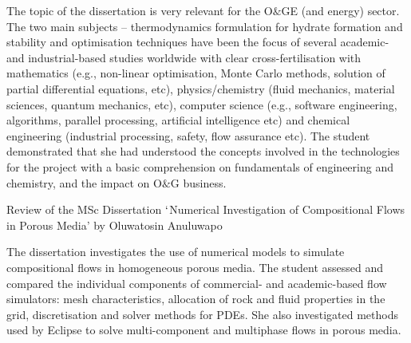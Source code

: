 \documentclass[14pt,twoside]{report}
\begin{document}
The topic of the dissertation is very relevant for the O$\&$GE (and energy) sector. The two main subjects -- thermodynamics formulation for hydrate formation and stability and optimisation techniques  have been the focus of several academic- and industrial-based studies worldwide with clear cross-fertilisation with mathematics (e.g., non-linear optimisation, Monte Carlo methods, solution of partial differential equations, etc), physics/chemistry (fluid mechanics, material sciences, quantum mechanics, etc), computer science (e.g., software engineering, algorithms, parallel processing, artificial intelligence etc) and chemical engineering (industrial processing, safety, flow assurance etc). The student demonstrated that she had understood the concepts involved in the technologies for the project with a basic comprehension on fundamentals of engineering and chemistry, and the impact on O$\&$G business.    


\clearpage



\medskip

\begin{center}
{\Large Review of the MSc Dissertation $\lq$Numerical Investigation of Compositional Flows in Porous Media' by Oluwatosin Anuluwapo}
\end{center}

\medskip

The dissertation investigates the use of numerical models to simulate compositional flows in homogeneous porous media. The student assessed and compared the individual components of commercial- and academic-based flow simulators: mesh characteristics, allocation of rock and fluid properties in the grid, discretisation and solver methods for PDEs. She also investigated methods used by Eclipse to solve multi-component and multiphase flows in porous media.
\end{document}

